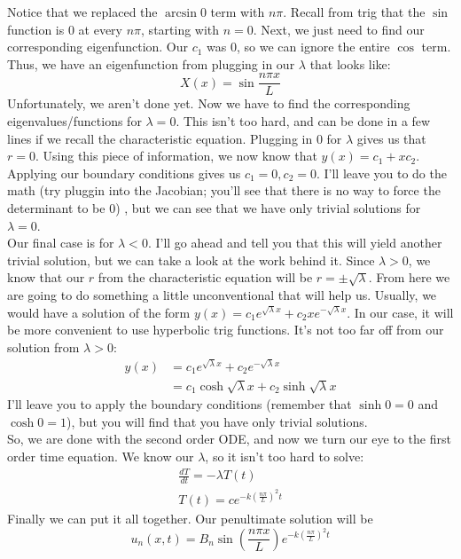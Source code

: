 \documentclass{article}
\begin{document}
\noindent Notice that we replaced the $\arcsin{0}$ term with $n\pi$. Recall from trig that the $\sin$ function is $0$ at every $n\pi$, starting with $n = 0$. Next, we just need to find our corresponding eigenfunction. Our $c_{1}$ was $0$, so we can ignore the entire $\cos$ term. Thus, we have an eigenfunction from plugging in our $\lambda$ that looks like:
\[
X(x) = \sin{\frac{n\pi x}{L}}
\]
\indent Unfortunately, we aren't done yet. Now we have to find the corresponding eigenvalues/functions for $\lambda = 0$. This isn't too hard, and can be done in a few lines if we recall the characteristic equation. Plugging in $0$ for $\lambda$ gives us that $r = 0$. Using this piece of information, we now know that $y(x) = c_{1} + xc_{2}$. Applying our boundary conditions gives us $c_{1} = 0, c_{2} = 0$. I'll leave you to do the math (try pluggin into the Jacobian; you'll see that there is no way to force the determinant to be 0) , but we can see that we have only trivial solutions for $\lambda = 0$.\\
\indent Our final case is for $\lambda < 0$. I'll go ahead and tell you that this will yield another trivial solution, but we can take a look at the work behind it. Since $\lambda > 0$, we know that our $r$ from the characteristic equation will be $r = \pm \sqrt{\lambda}$. From here we are going to do something a little unconventional that will help us. Usually, we would have a solution of the form $y(x) = c_{1}e^{\sqrt{\lambda}x} + c_{2}x e^{-\sqrt{\lambda}x}$. In our case, it will be more convenient to use hyperbolic trig functions. It's not too far off from our solution from $\lambda > 0$:
\begin{align*}
y(x) &= c_{1}e^{\sqrt{\lambda}x} + c_{2}e^{-\sqrt{\lambda}x}\\
&= c_{1}\cosh{\sqrt{\lambda}x} + c_{2}\sinh{\sqrt{\lambda}x}
\end{align*}
\noindent I'll leave you to apply the boundary conditions (remember that $\sinh{0} = 0$ and $\cosh{0} = 1$), but you will find that you have only trivial solutions.\\
\indent So, we are done with the second order ODE, and now we turn our eye to the first order time equation. We know our $\lambda$, so it isn't too hard to solve:
\begin{gather*}
\frac{dT}{dt} = -\lambda T(t)\\
T(t) = ce^{-k\left(\frac{n\pi}{L}\right)^{2}t}
\end{gather*}
\indent Finally we can put it all together. Our penultimate solution will be 
\[
u_{n}(x,t) = B_{n}\sin{\left(\frac{n\pi x}{L}\right)}e^{-k\left(\frac{n\pi}{L}\right)^{2}t}
\]
\end{document}
